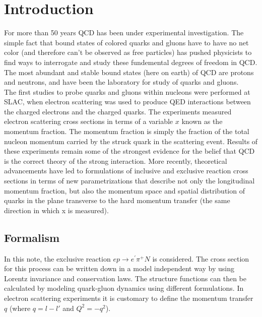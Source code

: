 \section{Introduction}


For more than 50 years QCD has been under experimental investigation.  The simple fact that bound states of colored quarks and gluons have to have no net color (and therefore can't be observed as free particles) has pushed physicists to find ways to interrogate and study these fundemental degrees of freedom in QCD.  The most abundant and stable bound states (here on earth) of QCD are protons and neutrons, and have been the laboratory for study of quarks and gluons. \\

The first studies to probe quarks and gluons within nucleons were performed at SLAC, when electron scattering was used to produce QED interactions between the charged electrons and the charged quarks.  The experiments measured electron scattering cross sections in terms of a variable $x$ known as the momentum fraction.  The momentum fraction is simply the fraction of the total nucleon momentum carried by the struck quark in the scattering event.  Results of these experiments remain some of the strongest evidence for the belief that QCD is the correct theory of the strong interaction. More recently, theoretical advancements have led to formulations of inclusive and exclusive reaction cross sections in terms of new parametrizations that describe not only the longitudinal momentum fraction, but also the momentum space and spatial distribution of quarks in the plane transverse to the hard momentum transfer (the same direction in which x is measured).  \\


\subsection{Formalism}
In this note, the exclusive reaction $e p \rightarrow e^\prime \pi^+ N$ is considered.  The cross section for this process can be written down in a model independent way by using Lorentz invariance and conservation laws.  The structure functions can then be calculated by modeling quark-gluon dynamics using different formulations.  In electron scattering experiments it is customary to define the momentum transfer $q$ (where $q = l - l'$ and $Q^{2} = -q^{2}$). 

